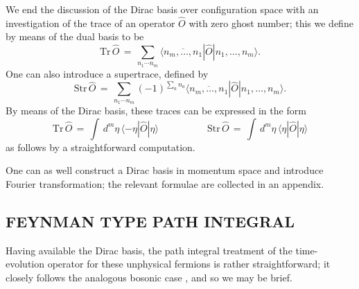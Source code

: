 \documentclass[a4paper,10pt]{article}
\begin{document}
We end the discussion of the Dirac basis over configuration space with an investigation of 
the trace of an operator $\hat{O}$ with zero ghost number; this we define by means of the 
dual basis to be
\begin{equation}
\mathrm{Tr}\,\hat{O}\,=\,\sum_{n_1\cdots 
n_m}\langle\overline{n_m,\ldots,n_1}|\hat{O}|n_1,\ldots,n_m\rangle.
\end{equation}
One can also introduce a supertrace, defined by
\begin{equation}
\mathrm{Str}\,\hat{O}\,=\,\sum_{n_1\cdots n_m}(-
1)^{\sum_an_a}\langle\overline{n_m,\ldots,n_1}|\hat{O}|n_1,\ldots,n_m\rangle.
\end{equation}
By means of the Dirac basis, these traces can be expressed in the form
\begin{equation}\label{traceandsupetraceghostfermionsincoordinatespace}
\mathrm{Tr}\,\hat{O}\,=\,\int\,d^{m}\eta\,\langle-
\eta|\hat{O}|\eta\rangle\qquad\qquad\quad
\mathrm{Str}\,\hat{O}\,=\,\int\,d^{m}\eta\,\langle\eta|\hat{O}|\eta\rangle
\end{equation}
as follows by a straightforward computation.

One can as well construct a Dirac basis in momentum space and introduce Fourier 
transformation; the relevant formulae are collected in an appendix.


\subsection{FEYNMAN TYPE PATH INTEGRAL}

Having available the Dirac basis, the path integral treatment of the time-evolution 
operator for these unphysical fermions is rather straightforward; it closely follows the 
analogous bosonic case \cite{Fadd 76}, and so we may be brief.
\end{document}
